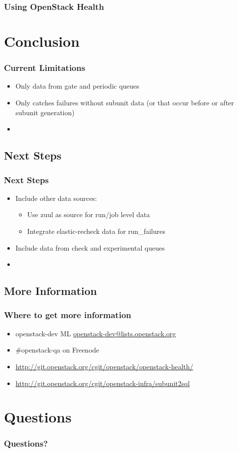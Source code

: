 \documentclass[aspectratio=169,11pt,hyperref={colorlinks=true}]{beamer}
\begin{document}
\begin{frame}
	\frametitle{Using OpenStack Health}
\end{frame}

\section{Conclusion}

\begin{frame}
    \frametitle{Current Limitations}
    \begin{itemize}
        \item Only data from gate and periodic queues
        \item Only catches failures without subunit data (or that occur before or after subunit generation)
        \item 
    \end{itemize}
\end{frame}

\subsection{Next Steps}
\begin{frame}
    \frametitle{Next Steps}
    \begin{itemize}
        \item Include other data sources:
            \begin{itemize}
                \item Use zuul as source for run/job level data
                \item Integrate elastic-recheck data for run\_failures
             \end{itemize}
        \item Include data from check and experimental queues
        \item
    \end{itemize}
\end{frame}

\subsection{More Information}
\begin{frame}
\frametitle{Where to get more information}
    \begin{itemize}
        \item openstack-dev ML\: \href{mailto:openstack-dev@lists.openstack.org}{openstack-dev@lists.openstack.org}
        \item \#openstack-qa on Freenode
        \item \href{http://git.openstack.org/cgit/openstack/openstack-health/}{http://git.openstack.org/cgit/openstack/openstack-health/}
        \item \href{http://git.openstack.org/cgit/openstack-infra/subunit2sql}{http://git.openstack.org/cgit/openstack-infra/subunit2sql}

    \end{itemize}
\end{frame}

\section{Questions}
\begin{frame}
\frametitle{Questions?}
\end{frame}
\end{document}
